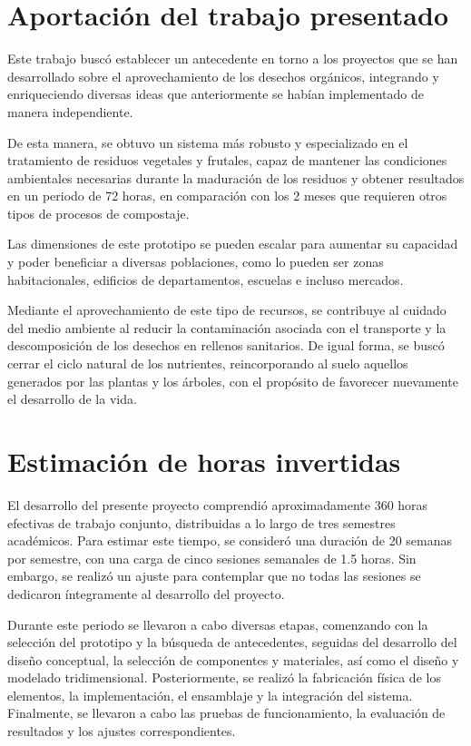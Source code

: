 \section{Aportación del trabajo presentado}


Este trabajo buscó establecer un antecedente en torno a los proyectos que se han desarrollado sobre el aprovechamiento de los desechos orgánicos, integrando y enriqueciendo diversas ideas que anteriormente se habían implementado de manera independiente.

De esta manera, se obtuvo un sistema más robusto y especializado en el tratamiento de residuos vegetales y frutales, capaz de mantener las condiciones ambientales necesarias durante la maduración de los residuos y obtener resultados en un periodo de 72 horas, en comparación con los 2 meses que requieren otros tipos de procesos de compostaje.

Las dimensiones de este prototipo se pueden escalar para aumentar su capacidad y poder beneficiar a diversas poblaciones, como lo pueden ser zonas habitacionales, edificios de departamentos, escuelas e incluso mercados.

Mediante el aprovechamiento de este tipo de recursos, se contribuye al cuidado del medio ambiente al reducir la contaminación asociada con el transporte y la descomposición de los desechos en rellenos sanitarios. De igual forma, se buscó cerrar el ciclo natural de los nutrientes, reincorporando al suelo aquellos generados por las plantas y los árboles, con el propósito de favorecer nuevamente el desarrollo de la vida.

\newpage

\section{Estimación de horas invertidas}

El desarrollo del presente proyecto comprendió aproximadamente 360 horas efectivas de trabajo conjunto, distribuidas a lo largo de tres semestres académicos. Para estimar este tiempo, se consideró una duración de 20 semanas por semestre, con una carga de cinco sesiones semanales de 1.5 horas. Sin embargo, se realizó un ajuste para contemplar que no todas las sesiones se dedicaron íntegramente al desarrollo del proyecto.

Durante este periodo se llevaron a cabo diversas etapas, comenzando con la selección del prototipo y la búsqueda de antecedentes, seguidas del desarrollo del diseño conceptual, la selección de componentes y materiales, así como el diseño y modelado tridimensional. Posteriormente, se realizó la fabricación física de los elementos, la implementación, el ensamblaje y la integración del sistema. Finalmente, se llevaron a cabo las pruebas de funcionamiento, la evaluación de resultados y los ajustes correspondientes.

